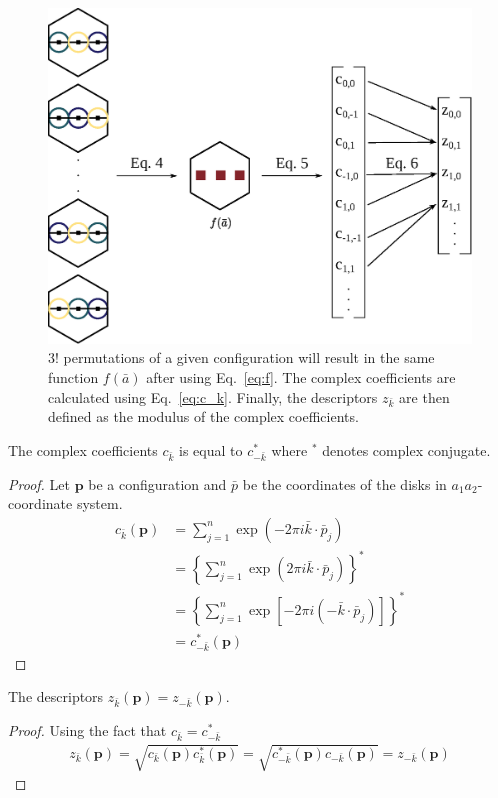 \documentclass[default,iicol]{sn-jnl}%
\theoremstyle{thmstyleone}%
\theoremstyle{thmstyletwo}%
\theoremstyle{thmstylethree}%
\renewcommand{\vec}[1]{\bar{#1}}
\providecommand{\config}[1]{\mathbf{#1}}
\providecommand{\rmi}{i}
\begin{document}
\begin{appendices}
	\begin{figure}
		\centering
		\includegraphics[width=1.0\columnwidth]{app1.eps}
		\caption{$3!$ permutations of a given configuration will result in the same function $f(\vec{a})$ after using Eq.\ \ref{eq:f}. The complex coefficients are calculated using Eq.\ \ref{eq:c_k}. Finally, the descriptors $z_{\vec{k}}$ are then defined as the modulus of the complex coefficients.}
		\label{fig:app1}
	\end{figure}
	
	The complex coefficients $c_{\vec{k}}$ is equal to $c^{\ast}_{-\vec{k}}$ where $^{\ast}$ denotes complex conjugate.
	\begin{proof}
		Let $\config{p}$ be a configuration and $\vec{p}$ be the coordinates of the disks in $a_1a_2$-coordinate system.
		\begin{align*} 
		c_{\vec{k}}(\config{p}) &=  \sum_{j=1}^{n} \exp{(-2\pi \rmi \vec{k} \cdot \vec{p}_j)} \nonumber \\ 
		&= \left\{ \sum_{j=1}^{n} \exp{(2\pi \rmi \vec{k} \cdot \vec{p}_j)} \right\}^{\ast} \nonumber \\
		&= \left\{ \sum_{j=1}^{n} \exp{[-2\pi \rmi (-\vec{k} \cdot \vec{p}_j)]} \right\}^{\ast} \nonumber \\
		&= c_{-\vec{k}}^{\ast}(\config{p})
		\end{align*}
	\end{proof}	

	The descriptors $z_{\vec{k}}(\config{p}) = z_{-\vec{k}}(\config{p})$.
	\begin{proof}
		Using the fact that $c_{\vec{k}} = c^{\ast}_{-\vec{k}}$
		\begin{align*} 
		z_{\vec{k}}(\config{p}) =  \sqrt{c_{\vec{k}}(\config{p}) c_{\vec{k}}^\ast(\config{p})} = \sqrt{c^{\ast}_{-\vec{k}}(\config{p}) c_{-\vec{k}}(\config{p})} = z_{-\vec{k}}(\config{p})
		\end{align*}
	\end{proof}		
	

\end{appendices}
\end{document}
